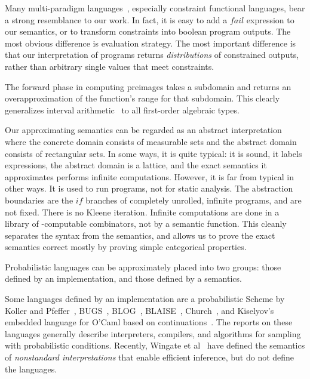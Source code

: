 \documentclass{llncs}
\begin{document}
Many multi-paradigm languages~\cite{cit:hanus-2007lp-multi-paradigm}, especially constraint functional languages, bear a strong resemblance to our work.
In fact, it is easy to add a $fail$ expression to our semantics, or to transform constraints into boolean program outputs.
The most obvious difference is evaluation strategy.
The most important difference is that our interpretation of programs returns \emph{distributions} of constrained outputs, rather than arbitrary single values that meet constraints.

The forward phase in computing preimages takes a subdomain and returns an overapproximation of the function's range for that subdomain.
This clearly generalizes interval arithmetic~\cite{cit:kearfott-1996eb-interval} to all first-order algebraic types.

Our approximating semantics can be regarded as an abstract interpretation~\cite{cit:cousot-1977popl-abstract-interpretation} where the concrete domain consists of measurable sets and the abstract domain consists of rectangular sets.
In some ways, it is quite typical: it is sound, it labels expressions, the abstract domain is a lattice, and the exact semantics it approximates performs infinite computations.
However, it is far from typical in other ways.
It is used to run programs, not for static analysis.
The abstraction boundaries are the $if$ branches of completely unrolled, infinite programs, and are not fixed.
There is no Kleene iteration.
Infinite computations are done in a library of \lzfclang-computable combinators, not by a semantic function.
This cleanly separates the syntax from the semantics, and allows us to prove the exact semantics correct mostly by proving simple categorical properties.

Probabilistic languages can be approximately placed into two groups: those defined by an implementation, and those defined by a semantics.

Some languages defined by an implementation are a probabilistic Scheme by Koller and Pfeffer~\cite{cit:koller-1997aaai-bayes-programs-short}, BUGS~\cite{cit:winbugs-language-short}, BLOG~\cite{cit:blog-language-short}, BLAISE~\cite{cit:blaise-language}, Church~\cite{cit:church-language-short}, and Kiselyov's embedded language for O'Caml based on continuations~\cite{cit:kiselyov-2008uai-monolingual}.
The reports on these languages generally describe interpreters, compilers, and algorithms for sampling with probabilistic conditions.
Recently, Wingate et al~\cite{cit:wingate-2011ais-lightweight,cit:wingate-2011nips-nonstandard} have defined the semantics of \emph{nonstandard interpretations} that enable efficient inference, but do not define the languages.
\end{document}
